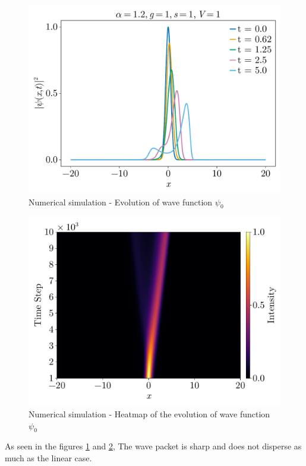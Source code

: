 \documentclass[8pt, a4paper, twocolumn]{article}
\begin{document}
\begin{figure}[h!]
	\centering
	\includegraphics[width=\linewidth]{../figs/fnlse_evolution_00.pdf}
	\caption{Numerical simulation - Evolution of wave function $\psi_0$}
	\label{fig:nnfse_evolution_alpha00}
\end{figure}
\begin{figure}[h!]
	\centering
	\includegraphics[width=\linewidth]{../figs/fnlse_heatmap_00.pdf}
	\caption{Numerical simulation - Heatmap of the evolution of wave function $\psi_0$}
	\label{fig:nnfse_heatmap_alpha00}
\end{figure}

As seen in the figures \ref{fig:nnfse_evolution_alpha00} and \ref{fig:nnfse_heatmap_alpha00}, The
wave packet is sharp and does not disperse as much as the linear case. 
\end{document}
